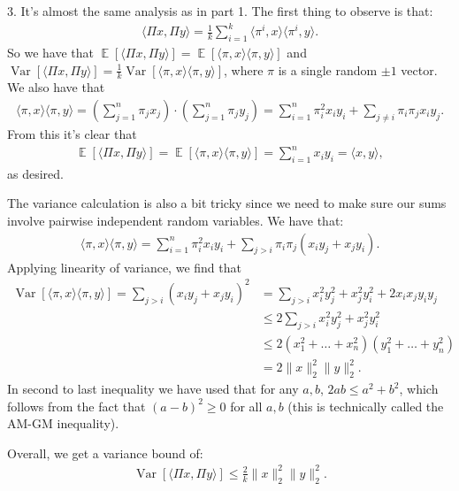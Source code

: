 \documentclass[11pt]{article}
\DeclareMathOperator*{\E}{\mathbb{E}}
\DeclareMathOperator{\var}{Var}
\begin{document}
\vspace{.5em}
3. It's almost the same analysis as in part 1. The first thing to observe is that:
\begin{align*}
	\langle \Pi x, \Pi y\rangle  = \frac{1}{k}\sum_{i=1}^k \langle \pi^i, x\rangle \langle \pi^i, y\rangle. 
\end{align*}
So we have that $\E[\langle \Pi x, \Pi y\rangle] = \E[\langle \pi, x\rangle \langle \pi, y\rangle]$ and $\var[\langle \Pi x, \Pi y\rangle] = \frac{1}{k}\var[\langle \pi, x\rangle \langle \pi, y\rangle]$, where $\pi$ is a single random $\pm 1$ vector. We also have that 
\begin{align*}
	\langle \pi, x\rangle \langle \pi, y\rangle = \left(\sum_{j=1}^n \pi_j x_j \right)\cdot  \left(\sum_{j=1}^n \pi_j y_j \right) = \sum_{i=1}^n\pi_i^2 x_iy_i + \sum_{j\neq i}\pi_i\pi_j x_iy_j.
\end{align*}
From this it's clear that 
\begin{align*}
		\E[\langle \Pi x, \Pi y\rangle]  = \E[\langle \pi, x\rangle \langle \pi, y\rangle] = \sum_{i=1}^n x_iy_i  = \langle x,y\rangle, 
\end{align*}
as desired. 

The variance calculation is also a bit tricky since we need to make sure our sums involve pairwise independent random variables. We have that: 
\begin{align*}
	\langle \pi, x\rangle \langle \pi, y\rangle = \sum_{i=1}^n\pi_i^2 x_iy_i + \sum_{j> i}\pi_i\pi_j (x_iy_j + x_jy_i).
\end{align*}
Applying linearity of variance, we find that 
\begin{align*}
	\var[\langle \pi, x\rangle \langle \pi, y\rangle] = \sum_{j> i} (x_iy_j + x_jy_i)^2 &= \sum_{j> i} x_i^2y_j^2 + x_j^2y_i^2  + 2 x_ix_jy_iy_j \\
	&\leq 2 \sum_{j> i} x_i^2y_j^2 + x_j^2y_i^2 \\
	& \leq 2(x_1^2 + \ldots + x_n^2)(y_1^2 + \ldots + y_n^2) \\
	&= 2 \|x\|_2^2 \|y\|_2^2.
\end{align*}
In second to last inequality we have used that for any $a,b$, $2ab \leq a^2 + b^2$, which follows from the fact that $(a-b)^2 \geq 0$ for all $a,b$ (this is technically called the AM-GM inequality).

Overall, we get a variance bound of:
\begin{align*}
	\var[\langle \Pi x, \Pi y\rangle] \leq \frac{2}{k}\|x\|_2^2 \|y\|_2^2.
\end{align*}
\end{document}
